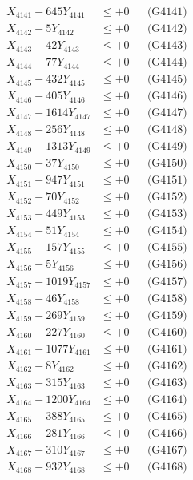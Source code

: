 \documentclass[a4paper,10pt]{article}
\begin{document}
{\begin{align}
\allowbreak
X_{4141} - 645Y_{4141} &\leq +0 && \text{(G4141)} \\
X_{4142} - 5Y_{4142} &\leq +0 && \text{(G4142)} \\
X_{4143} - 42Y_{4143} &\leq +0 && \text{(G4143)} \\
X_{4144} - 77Y_{4144} &\leq +0 && \text{(G4144)} \\
X_{4145} - 432Y_{4145} &\leq +0 && \text{(G4145)} \\
X_{4146} - 405Y_{4146} &\leq +0 && \text{(G4146)} \\
X_{4147} - 1614Y_{4147} &\leq +0 && \text{(G4147)} \\
X_{4148} - 256Y_{4148} &\leq +0 && \text{(G4148)} \\
X_{4149} - 1313Y_{4149} &\leq +0 && \text{(G4149)} \\
X_{4150} - 37Y_{4150} &\leq +0 && \text{(G4150)} \\
\allowbreak
X_{4151} - 947Y_{4151} &\leq +0 && \text{(G4151)} \\
X_{4152} - 70Y_{4152} &\leq +0 && \text{(G4152)} \\
X_{4153} - 449Y_{4153} &\leq +0 && \text{(G4153)} \\
X_{4154} - 51Y_{4154} &\leq +0 && \text{(G4154)} \\
X_{4155} - 157Y_{4155} &\leq +0 && \text{(G4155)} \\
X_{4156} - 5Y_{4156} &\leq +0 && \text{(G4156)} \\
X_{4157} - 1019Y_{4157} &\leq +0 && \text{(G4157)} \\
X_{4158} - 46Y_{4158} &\leq +0 && \text{(G4158)} \\
X_{4159} - 269Y_{4159} &\leq +0 && \text{(G4159)} \\
X_{4160} - 227Y_{4160} &\leq +0 && \text{(G4160)} \\
\allowbreak
X_{4161} - 1077Y_{4161} &\leq +0 && \text{(G4161)} \\
X_{4162} - 8Y_{4162} &\leq +0 && \text{(G4162)} \\
X_{4163} - 315Y_{4163} &\leq +0 && \text{(G4163)} \\
X_{4164} - 1200Y_{4164} &\leq +0 && \text{(G4164)} \\
X_{4165} - 388Y_{4165} &\leq +0 && \text{(G4165)} \\
X_{4166} - 281Y_{4166} &\leq +0 && \text{(G4166)} \\
X_{4167} - 310Y_{4167} &\leq +0 && \text{(G4167)} \\
X_{4168} - 932Y_{4168} &\leq +0 && \text{(G4168)} \\

\end{align}}
\end{document}
